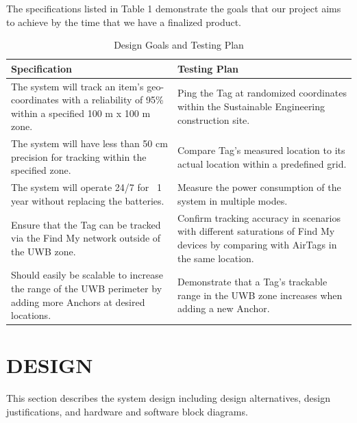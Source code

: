 \documentclass[conference]{IEEEtran}
\begin{document}
The specifications listed in Table 1 demonstrate the goals that our project 
aims to achieve by the time that we have a finalized product.
\begin{center}
\begin{table}
\caption{Design Goals and Testing Plan}
\begin{tabular}{|p{4cm}|p{4cm}|}
    \hline
    \textbf{Specification}  & \textbf{Testing Plan}\\
    \hline
    The system will track an item’s geo-coordinates with a reliability of 
    95\% within a specified 100 m x 100 m zone. 
    &
    Ping the Tag at randomized coordinates within the Sustainable 
    Engineering construction site.\\
    \hline
    The system will have less than 50 cm precision for tracking within 
    the specified zone.
    &
    Compare Tag’s measured location to its actual location 
    within a predefined grid.\\
    \hline
    The system will operate 24/7 for ~1 year without 
    replacing the batteries.
    &
    Measure the power consumption of the system in multiple modes.\\
    \hline
    Ensure that the Tag can be tracked via the Find My network outside 
    of the UWB zone.
    &
    Confirm tracking accuracy in scenarios with different saturations 
    of Find My devices by comparing with AirTags in the same location.\\
    \hline
    Should easily be scalable to increase the range of the UWB perimeter 
    by adding more Anchors at desired locations.
    &
    Demonstrate that a Tag’s trackable range in the UWB zone increases 
    when adding a new Anchor.\\
    \hline
\end{tabular}
\end{table}
\end{center}


\section{DESIGN}

This section describes the system design including design alternatives, 
design justifications, and hardware and software block diagrams.
\end{document}
